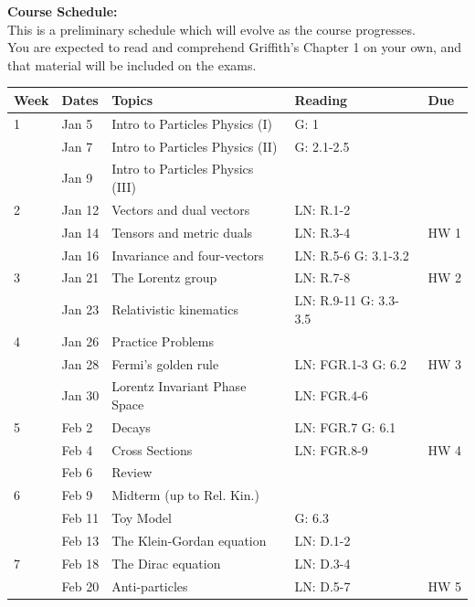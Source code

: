 \documentclass[12pt]{article}
\begin{document}
\newpage

\noindent
\textbf {Course Schedule:}\\ This is a preliminary schedule which will
evolve as the course progresses.\\ You are expected to read and
comprehend Griffith's Chapter 1 on your own, and that material will be
included on the exams.\\[3pt]

\noindent
\noindent
\begin{tabular}{lllll}
\textbf{Week} & \textbf{Dates} & \textbf{Topics} & \textbf{Reading} & Due \\
\hline
1  & Jan 5   & Intro to Particles Physics (I)    & G: 1\\
   & Jan 7   & Intro to Particles Physics (II)   & G: 2.1-2.5\\
   & Jan 9   & Intro to Particles Physics (III)  & \\
\hline
2  & Jan 12  & Vectors and dual vectors          & LN: R.1-2 \\
   & Jan 14  & Tensors and metric duals          & LN: R.3-4 & HW 1 \\
   & Jan 16  & Invariance and four-vectors       & LN: R.5-6 G: 3.1-3.2\\
\hline
3  & Jan 21  & The Lorentz group                 & LN: R.7-8 & HW 2\\ 
   & Jan 23  & Relativistic kinematics           & LN: R.9-11 G: 3.3-3.5\\
\hline
4  & Jan 26  & Practice Problems                 & \\
   & Jan 28  & Fermi's golden rule               & LN: FGR.1-3 G: 6.2 & HW 3 \\
   & Jan 30  & Lorentz Invariant Phase Space     & LN: FGR.4-6 \\ 
\hline
5  & Feb 2   & Decays                            & LN: FGR.7 G: 6.1 \\
   & Feb 4   & Cross Sections                    & LN: FGR.8-9 & HW 4 \\
   & Feb 6   & Review                            & \\
\hline
6  & Feb 9   & Midterm (up to Rel. Kin.)         & \\
   & Feb 11  & Toy Model                         & G: 6.3 \\
   & Feb 13  & The Klein-Gordan equation         & LN: D.1-2 \\
\hline
7  & Feb 18  & The Dirac equation                & LN: D.3-4 \\
   & Feb 20  & Anti-particles                    & LN: D.5-7 & HW 5\\

\end{tabular}
\end{document}
